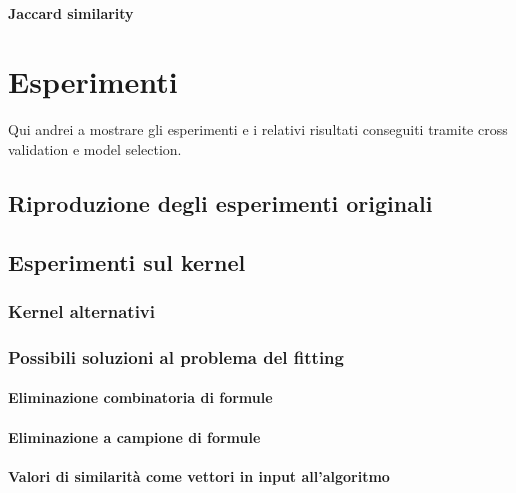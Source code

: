\documentclass[12pt,a4paper]{report}
\begin{document}
\subsubsection{Jaccard similarity}

\chapter{Esperimenti}
Qui andrei a mostrare gli esperimenti e i relativi risultati conseguiti tramite cross validation e model selection.
\section{Riproduzione degli esperimenti originali}
\section{Esperimenti sul kernel}
\subsection{Kernel alternativi}
\subsection{Possibili soluzioni al problema del fitting}
\subsubsection{Eliminazione combinatoria di formule}
\subsubsection{Eliminazione a campione di formule}
\subsubsection{Valori di similarità come vettori in input all'algoritmo}


\end{document}

